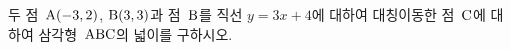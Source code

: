 두 점~$\mathrm{A}(-3{,}\mkern3mu\mathopen{}2)$, $\mathrm{B}(3{,}\mkern3mu\mathopen{}3)$과 점~$\mathrm{B}$를 직선 $y=3x+4$에 대하여 대칭이동한 점~$\mathrm{C}$에 대하여 삼각형~$\mathrm{ABC}$의 넓이를 구하시오.
